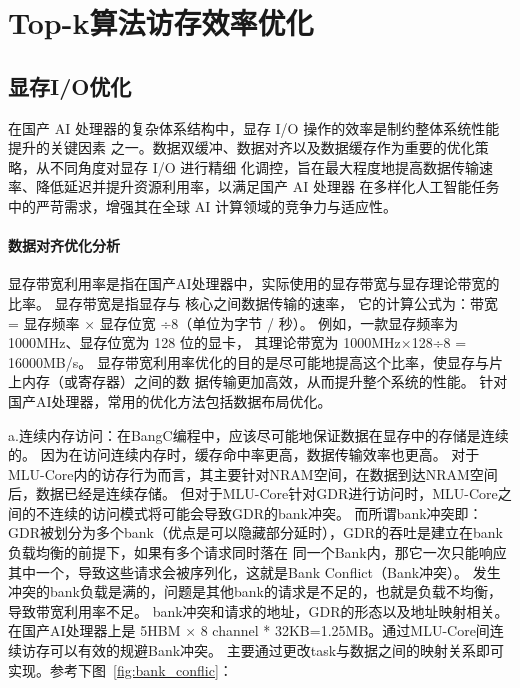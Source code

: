 \section{Top-k算法访存效率优化}




\subsection{显存I/O优化}
在国产 AI 处理器的复杂体系结构中，显存 I/O 操作的效率是制约整体系统性能提升的关键因素
之一。数据双缓冲、数据对齐以及数据缓存作为重要的优化策略，从不同角度对显存 I/O 进行精细
化调控，旨在最大程度地提高数据传输速率、降低延迟并提升资源利用率，以满足国产 AI 处理器
在多样化人工智能任务中的严苛需求，增强其在全球 AI 计算领域的竞争力与适应性。


\paragraph{数据对齐优化分析}

显存带宽利用率是指在国产AI处理器中，实际使用的显存带宽与显存理论带宽的比率。
显存带宽是指显存与 核心之间数据传输的速率，
它的计算公式为：带宽 = 显存频率 × 显存位宽 ÷8（单位为字节 / 秒）。
例如，一款显存频率为 1000MHz、显存位宽为 128 位的显卡，
其理论带宽为 1000MHz×128÷8 = 16000MB/s。
显存带宽利用率优化的目的是尽可能地提高这个比率，使显存与片上内存（或寄存器）之间的数
据传输更加高效，从而提升整个系统的性能。
针对国产AI处理器，常用的优化方法包括数据布局优化。

a.连续内存访问：在BangC编程中，应该尽可能地保证数据在显存中的存储是连续的。
因为在访问连续内存时，缓存命中率更高，数据传输效率也更高。
对于MLU-Core内的访存行为而言，其主要针对NRAM空间，在数据到达NRAM空间后，数据已经是连续存储。
但对于MLU-Core针对GDR进行访问时，MLU-Core之间的不连续的访问模式将可能会导致GDR的bank冲突。
而所谓bank冲突即：
GDR被划分为多个bank（优点是可以隐藏部分延时），GDR的吞吐是建立在bank负载均衡的前提下，如果有多个请求同时落在
同一个Bank内，那它一次只能响应其中一个，导致这些请求会被序列化，这就是Bank Conflict（Bank冲突）。
发生 冲突的bank负载是满的，问题是其他bank的请求是不足的，也就是负载不均衡，导致带宽利用率不足。
bank冲突和请求的地址，GDR的形态以及地址映射相关。
在国产AI处理器上是 5HBM × 8 channel * 32KB=1.25MB。通过MLU-Core间连续访存可以有效的规避Bank冲突。
主要通过更改task与数据之间的映射关系即可实现。参考下图~\ref{fig:bank_conflic}：

